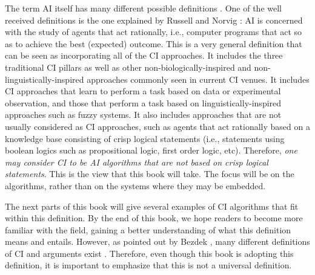 The term AI itself has many different possible definitions \cite{RussellNorvig}. One of the well received definitions is the one explained by Russell and Norvig \cite{RussellNorvig}: AI is concerned with the study of agents that act rationally, i.e., computer programs that act so as to achieve the best (expected) outcome. This is a very general definition that can be seen as incorporating all of the CI approaches. It includes the three traditional CI pillars as well as other non-biologically-inspired and non-linguistically-inspired approaches commonly seen in current CI venues. It includes CI approaches that learn to perform a task based on data or experimental observation, and those that perform a task based on linguistically-inspired approaches such as fuzzy systems.  It also includes approaches that are not usually considered as CI approaches, such as agents that act rationally based on a knowledge base consisting of crisp logical statements (i.e., statements using boolean logics such as propositional logic, first order logic, etc). Therefore, \textit{one may consider CI to be AI algorithms that are not based on crisp logical statements}. This is the view that this book will take. The focus will be on the algorithms, rather than on the systems where they may be embedded.

The next parts of this book will give several examples of CI algorithms that fit within this definition. By the end of this book, we hope readers to become more familiar with the field, gaining a better understanding of what this definition means and entails. However, as  pointed out by Bezdek \cite{Bezdek}, many different definitions of CI and arguments exist \cite{CIDef1,CIDef2,CIDef3,CIDef4,CIDef5,CIDef6,CIDef7,ciswebsite}. Therefore, even though this book is adopting this definition, it is important to emphasize that this is not a universal definition.




